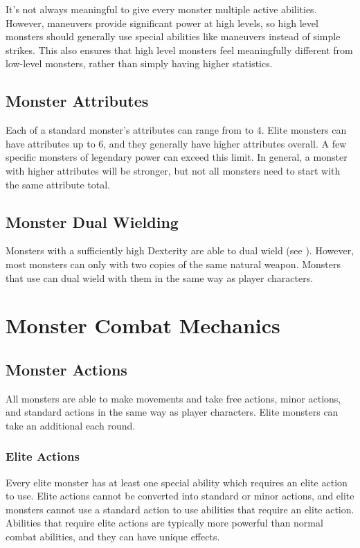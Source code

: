             It's not always meaningful to give every monster multiple active abilities.
            However, maneuvers provide significant power at high levels, so high level monsters should generally use special abilities like maneuvers instead of simple strikes.
            This also ensures that high level monsters feel meaningfully different from low-level monsters, rather than simply having higher statistics.

    \subsection{Monster Attributes}\label{Monster Attributes}
        Each of a standard monster's attributes can range from  to 4.
        Elite monsters can have attributes up to 6, and they generally have higher attributes overall.
        A few specific monsters of legendary power can exceed this limit.
        In general, a monster with higher attributes will be stronger, but not all monsters need to start with the same attribute total.

    \subsection{Monster Dual Wielding}\label{Monster Dual Wielding}
        Monsters with a sufficiently high Dexterity are able to dual wield (see ).
        However, most monsters can only  with two copies of the same  natural weapon.
        Monsters that use  can dual wield with them in the same way as player characters.

\section{Monster Combat Mechanics}

    \subsection{Monster Actions}\label{Monster Actions}
        All monsters are able to make movements and take free actions, minor actions, and standard actions in the same way as player characters.
        Elite monsters can take an additional  each round.

        \subsubsection{Elite Actions}\label{Elite Actions}
            Every elite monster has at least one special ability which requires an elite action to use.
            Elite actions cannot be converted into standard or minor actions, and elite monsters cannot use a standard action to use abilities that require an elite action.
            Abilities that require elite actions are typically more powerful than normal combat abilities, and they can have unique effects.

